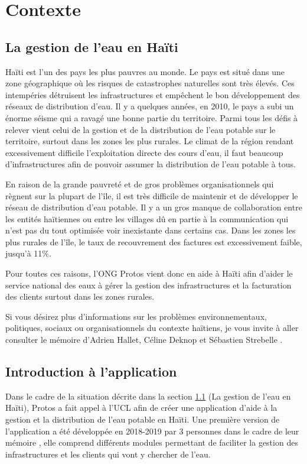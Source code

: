 \documentclass{EPL-master-thesis-covers-FR}
\begin{document}

	\chapter{Contexte}


		\section{La gestion de l'eau en Haïti}
			\label{sec:situation}
			
				Haïti est l'un des pays les plus pauvres au monde. Le pays est situé dans une zone géographique où les risques de catastrophes naturelles sont très élevés. Ces intempéries détruisent les infrastructures et empêchent le bon développement des réseaux de distribution d'eau. Il y a quelques années, en 2010, le pays a subi un énorme séisme qui a ravagé une bonne partie du territoire. Parmi tous les défis à relever vient celui de la gestion et de la distribution de l'eau potable sur le territoire, surtout dans les zones les plus rurales. Le climat de la région rendant excessivement difficile l'exploitation directe des cours d'eau, il faut beaucoup d'infrastructures afin de pouvoir assumer la distribution de l'eau potable à tous.
				
				En raison de la grande pauvreté et de gros problèmes organisationnels qui règnent sur la plupart de l'île, il est très difficile de maintenir et de développer le réseau de distribution d'eau potable. Il y a un gros manque de collaboration entre les entités haïtiennes ou entre les villages dû en partie à la communication qui n'est pas du tout optimisée voir inexistante dans certains cas. Dans les zones les plus rurales de l'île, le taux de recouvrement des factures est excessivement faible, jusqu'à 11\%.
				
				Pour toutes ces raisons, l'ONG Protos vient donc en aide à Haïti afin d'aider le service national des eaux à gérer la gestion des infrastructures et la facturation des clients surtout dans les zones rurales.
				
				Si vous désirez plus d'informations sur les problèmes environnementaux, politiques, sociaux ou organisationnels du contexte haïtiens, je vous invite à aller consulter le mémoire d'Adrien Hallet, Céline Deknop et Sébastien Strebelle \cite{ref:haitiwater}.



		\section{Introduction à l'application}
				Dans le cadre de la situation décrite dans la section \ref{sec:situation} (La gestion de l'eau en Haïti), Protos a fait appel à l'UCL afin de créer une application d'aide à la gestion et la distribution de l'eau potable en Haïti. Une première version de l'application a été développée en 2018-2019 par 3 personnes dans le cadre de leur mémoire \cite{ref:haitiwater}, elle comprend différents modules permettant de faciliter la gestion des infrastructures et les clients qui vont y chercher de l'eau.
				
\end{document}
